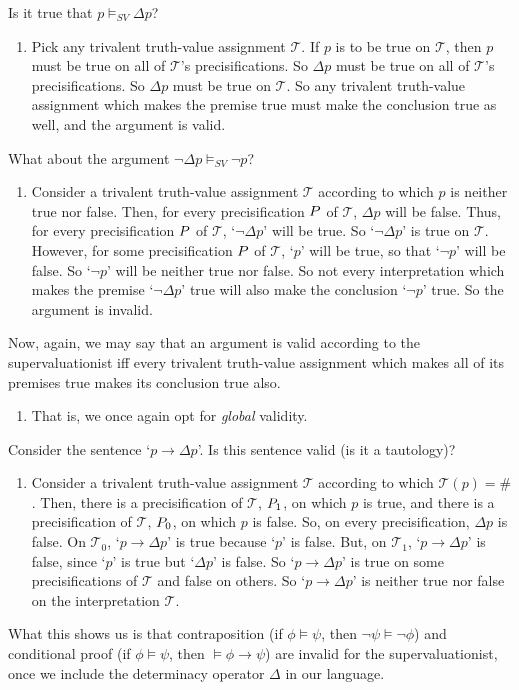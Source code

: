 \documentclass[landscape, two column, full page,reqno]{article}
\let\mathcal\relax
\newcommand{\mathcal}{\OMScal}%
\newcommand{\qe}{\begin{enumerate}[align=left,style=nextline,leftmargin=17pt,labelsep=5pt,font=\normalfont]}
\newcommand{\e}{\emph}
\renewcommand{\P}{\mathcal{P}}
\newcommand{\ze}{\end{enumerate}}
\newcommand{\p}{\item}
\newcommand{\qq}[1]{ \ulcorner #1 \urcorner}
\newcommand{\I}{\mathscr{T}}
\begin{document}
	
\p Is it true that $p \models_{SV} \Delta p$?
	\qe
	\p Pick any trivalent truth-value assignment $\I$.  If $p$ is to be true on $\I$, then $p$ must be true on all of $\I$'s  precisifications.  So $\Delta p$ must be true on all of $\I$'s precisifications.  So $\Delta p$ must be true on $\I$.  So any trivalent truth-value assignment which makes the premise true must make the conclusion true as well, and the argument is valid.
	\ze 
\p What about the argument $\neg \Delta p \models_{SV} \neg p$?
	\qe
	\p Consider a trivalent truth-value assignment $\I$ according to which $p$ is neither true nor false.  Then, for every precisification $\P$ of $\I$, $\Delta p$ will be false.  Thus, for every precisification $\P$ of $\I$, `$\neg \Delta p$' will be true.  So `$\neg \Delta p$' is true on $\I$.  However, for some precisification $\P$ of $\I$, `$p$' will be true, so that `$\neg p$' will be false.  So `$\neg p$' will be neither true nor false.  So not every interpretation which makes the premise `$\neg \Delta p$' true will also make the conclusion `$\neg p$' true.  So the argument is invalid.
	\ze 
\p Now, again, we may say that an argument is valid according to the supervaluationist iff every trivalent truth-value assignment which makes all of its premises true makes its conclusion true also.
	\qe
	\p That is, we once again opt for \e{global} validity.
	\ze 
\p  Consider the sentence `$p \to \Delta p$'.  Is this sentence valid (is it a tautology)?
	\qe
	\p Consider a trivalent truth-value assignment $\I$ according to which $\I(p) = \#$.  Then, there is a precisification of $\I$, $\P_1$, on which $p$ is true, and there is a precisification of $\I$, $\P_0$, on which $p$ is false.   So, on every precisification, $\Delta p$ is false.   On $\I_0$, `$p \to \Delta p$' is true because `$p$' is false.  But, on $\I_1$, `$p \to \Delta p$' is false, since `$p$' is true but `$\Delta p$' is false.  So `$p \to \Delta p$' is true on some precisifications of $\I$ and false on others.  So `$p \to \Delta p$' is neither true nor false on the interpretation $\I$.
	\ze 
\p What this shows us is that contraposition (if $\phi \models \psi$, then $\neg \psi \models \neg \phi$) and conditional proof (if $\phi \models \psi$, then $\models \phi \to \psi$) are invalid for the supervaluationist, once we include the determinacy operator $\Delta$ in our language.

\end{document}
